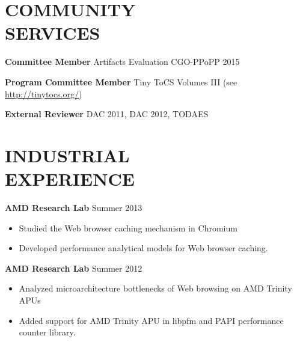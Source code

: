 \documentclass[margin, 9pt]{res} %
\begin{document}
\begin{resume}

\section{COMMUNITY\\ SERVICES}

\textbf{Committee Member} Artifacts Evaluation CGO-PPoPP 2015\par
\textbf{Program Committee Member} Tiny ToCS Volumes III (see \url{http://tinytocs.org/})\par
\textbf{External Reviewer} DAC 2011, DAC 2012, TODAES


\section{INDUSTRIAL\\ EXPERIENCE} 

{\textbf{AMD Research Lab}} \hfill{Summer 2013}\\
\vspace*{-10pt}
\begin{itemize}[leftmargin=*] \itemsep -3pt
\vspace*{-5pt}
	\item Studied the Web browser caching mechanism in Chromium
	\item Developed performance analytical models for Web browser caching.
\end{itemize}

\medskip
{\textbf{AMD Research Lab}} \hfill{Summer 2012}\\
\vspace*{-10pt}
\begin{itemize}[leftmargin=*] \itemsep -3pt
\vspace*{-5pt}
	\item Analyzed microarchitecture bottlenecks of Web browsing on AMD Trinity APUs
	\item Added support for AMD Trinity APU in libpfm and PAPI performance counter library.
\end{itemize}


\end{resume}
\end{document}

